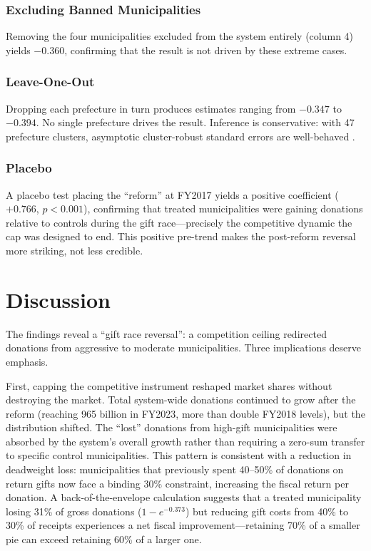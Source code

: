 \documentclass[12pt]{article}
\newcommand{\textyen}{\text{\yen}}
\begin{document}
\subsubsection*{Excluding Banned Municipalities} Removing the four municipalities excluded from the system entirely (column 4) yields $-0.360$, confirming that the result is not driven by these extreme cases.

\subsubsection*{Leave-One-Out} Dropping each prefecture in turn produces estimates ranging from $-0.347$ to $-0.394$. No single prefecture drives the result. Inference is conservative: with 47 prefecture clusters, asymptotic cluster-robust standard errors are well-behaved \citep{callaway2021difference}.

\subsubsection*{Placebo} A placebo test placing the ``reform'' at FY2017 yields a positive coefficient ($+0.766$, $p < 0.001$), confirming that treated municipalities were gaining donations relative to controls during the gift race---precisely the competitive dynamic the cap was designed to end. This positive pre-trend makes the post-reform reversal more striking, not less credible.

\section{Discussion}

The findings reveal a ``gift race reversal'': a competition ceiling redirected donations from aggressive to moderate municipalities. Three implications deserve emphasis.

First, capping the competitive instrument reshaped market shares without destroying the market. Total system-wide donations continued to grow after the reform (reaching \textyen 965 billion in FY2023, more than double FY2018 levels), but the distribution shifted. The ``lost'' donations from high-gift municipalities were absorbed by the system's overall growth rather than requiring a zero-sum transfer to specific control municipalities. This pattern is consistent with a reduction in deadweight loss: municipalities that previously spent 40--50\% of donations on return gifts now face a binding 30\% constraint, increasing the fiscal return per donation. A back-of-the-envelope calculation suggests that a treated municipality losing 31\% of gross donations ($1 - e^{-0.373}$) but reducing gift costs from 40\% to 30\% of receipts experiences a net fiscal improvement---retaining 70\% of a smaller pie can exceed retaining 60\% of a larger one.
\end{document}
